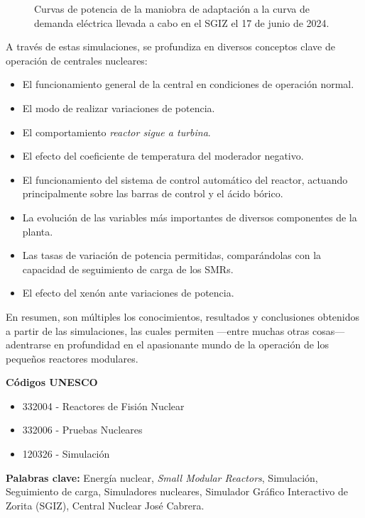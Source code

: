\documentclass[a4paper, 11pt, spanish, twoside]{article}
\begin{document}
\begin{itemize}
\begin{enumerate}
\begin{figure}[h!]
            \caption{Curvas de potencia de la maniobra de adaptación a la curva de demanda eléctrica llevada a cabo en el SGIZ el 17 de junio de 2024.}
            \label{fig:sim4_potencias}
            \vspace{-0.7cm}
        \end{figure}
    \end{enumerate}
\end{itemize}

A través de estas simulaciones, se profundiza en diversos conceptos clave de operación de centrales nucleares:

\begin{itemize}
    \item El funcionamiento general de la central en condiciones de operación normal.
    \item El modo de realizar variaciones de potencia.
    \item El comportamiento \textit{reactor sigue a turbina}.
    \item El efecto del coeficiente de temperatura del moderador negativo.
    \item El funcionamiento del sistema de control automático del reactor, actuando principalmente sobre las barras de control y el ácido bórico.
    \item La evolución de las variables más importantes de diversos componentes de la planta.
    \item Las tasas de variación de potencia permitidas, comparándolas con la capacidad de seguimiento de carga de los SMRs.
    \item El efecto del xenón ante variaciones de potencia.
\end{itemize}

En resumen, son múltiples los conocimientos, resultados y conclusiones obtenidos a partir de las simulaciones, las cuales permiten ---entre muchas otras cosas--- adentrarse en profundidad en el apasionante mundo de la operación de los pequeños reactores modulares.

\vspace{0.6cm}
\textbf{Códigos UNESCO}
    \begin{itemize}
        \item 332004 - Reactores de Fisión Nuclear
        \item 332006 - Pruebas Nucleares
        \item 120326 - Simulación
    \end{itemize}

 \textbf{Palabras clave:} Energía nuclear, \textit{Small Modular Reactors}, Simulación, Seguimiento de carga, Simuladores nucleares, Simulador Gráfico Interactivo de Zorita (SGIZ), Central Nuclear José Cabrera.
\end{document}
